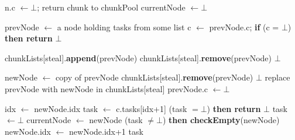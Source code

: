 \begin{algo}[!ht]
\begin{minipage}[t]{0.48\textwidth}
\begin{distribalgo}[1]
\medskip

  	\STATE n.c $\leftarrow \bot$; return chunk to chunkPool
  	\STATE currentNode $\leftarrow \bot$
  \ENDINDENT
\ENDINDENT


\setcounter{alg:non-fifo:lines}{\value{ALC@line}} %
\end{distribalgo}
\end{minipage}%
%
\hfill
%
\begin{minipage}[t]{0.48\textwidth}
%
\begin{distribalgo}[1]
\setcounter{ALC@line}{\value{alg:non-fifo:lines}}
\smallskip

	\STATE prevNode $\leftarrow$ a node holding tasks from some list  \label{alg:line:take-steal-chunk}
	\STATE c $\leftarrow$ prevNode.c; {\bf if} (c = $\bot$) {\bf then return} $\bot$

	\STATE chunkLists[steal].{\bf append}(prevNode)  \label{alg:line:resteal-begin}
	 \label{alg:line:chown}
 		\STATE chunkLists[steal].{\bf remove}(prevNode)
 		 $\bot$ 
	\ENDINDENT

	\smallskip
	\STATE newNode $\leftarrow$ copy of prevNode \label{alg:line:copy-prev-node}
	 \label{alg:line:steal-node-empty}
	  \STATE chunkLists[steal].{\bf remove}(prevNode)
	   $\bot$
	\ENDINDENT
	\STATE replace prevNode with newNode in chunkLists[steal]
	\STATE prevNode.c $\leftarrow \bot$  \label{alg:line:remove-chunk} \label{alg:line:resteal-end}
	
	\smallskip
	\STATE idx $\leftarrow$ newNode.idx
	\STATE task $\leftarrow$ c.tasks[idx+1] 
	 (task $= \bot$) {\bf then return} $\bot$  \label{alg:line:steal-chunk-not-full}
	 \label{alg:line:cas-steal} 
		\STATE task $\leftarrow \bot$
	\ENDINDENT
	\STATE currentNode $\leftarrow$ newNode
	 (task $\neq \bot$) {\bf then checkEmpty}(newNode)
	\STATE newNode.idx $\leftarrow$ newNode.idx+1
	 task
\ENDINDENT

\setcounter{alg:non-fifo:lines}{\value{ALC@line}}
\end{distribalgo}
\end{minipage}
\end{algo}

